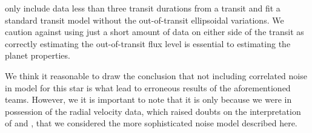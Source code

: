 \documentclass[apjl]{emulateapj}
\begin{document}
\citet{sliski14} only include data less than three transit durations from a transit and fit a standard transit model without the out-of-transit ellipsoidal variations. We caution against using just a short amount of data on either side of the transit as correctly estimating the out-of-transit flux level is essential to estimating the planet properties.

We think it reasonable to draw the conclusion that not including correlated noise in model for this star is what lead to erroneous results of the aforementioned teams. However, we it is important to note that it is only because we were in possession of the radial velocity data, which raised doubts on the interpretation of \citeauthor{esteves13} and \citeauthor{sliski14}, that we considered the more sophisticated noise model described here.








\end{document}

